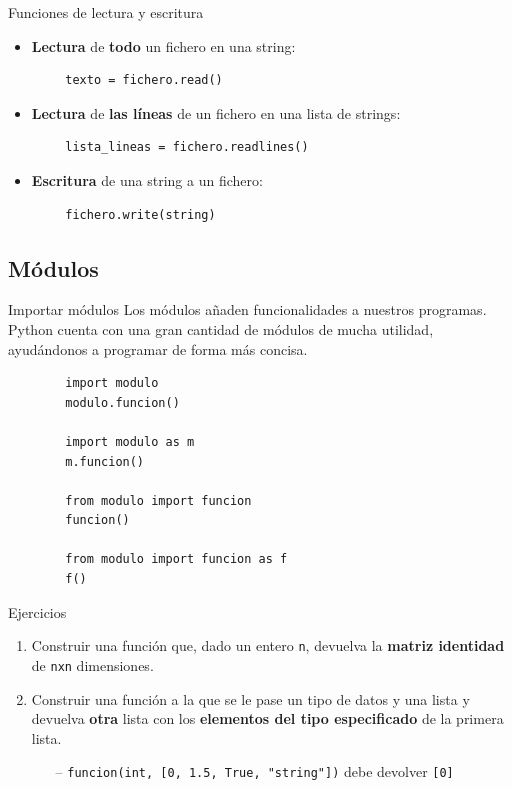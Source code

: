 \documentclass[10pt]{beamer} %
\begin{document}
\begin{frame}[fragile]{Funciones de lectura y escritura}
    \begin{itemize}
        \item \textbf{Lectura} de \textbf{todo} un fichero en una string:
    \end{itemize}
    \begin{verbatim}
        texto = fichero.read()
    \end{verbatim}
    \begin{itemize}
        \item \textbf{Lectura} de \textbf{las líneas} de un fichero en una lista de strings:
    \end{itemize}
    \begin{verbatim}
        lista_lineas = fichero.readlines()
    \end{verbatim}
    \begin{itemize}
        \item \textbf{Escritura} de una string a un fichero:
    \end{itemize}
    \begin{verbatim}
        fichero.write(string)
    \end{verbatim}
\end{frame}

\subsection{Módulos}
\begin{frame}[fragile]{Importar módulos}
    Los módulos añaden funcionalidades a nuestros programas. Python cuenta con una gran cantidad de módulos de mucha utilidad, ayudándonos a programar de forma más concisa.
    \begin{verbatim}
        import modulo
        modulo.funcion()
        
        import modulo as m
        m.funcion()
        
        from modulo import funcion
        funcion()
        
        from modulo import funcion as f
        f()
    \end{verbatim}
\end{frame}

\begin{frame}{Ejercicios}
    \begin{enumerate}
        \item Construir una función que, dado un entero \texttt{n}, devuelva la \textbf{matriz identidad} de \texttt{nxn} dimensiones.
        \item Construir una función a la que se le pase un tipo de datos y una lista y devuelva \textbf{otra} lista con los \textbf{elementos del tipo especificado} de la primera lista.
        \begin{itemize}
            \item[--] \texttt{funcion(int, [0, 1.5, True, "string"])} debe devolver \texttt{[0]}
        \end{itemize}
    \end{enumerate}
\end{frame}
\end{document}
